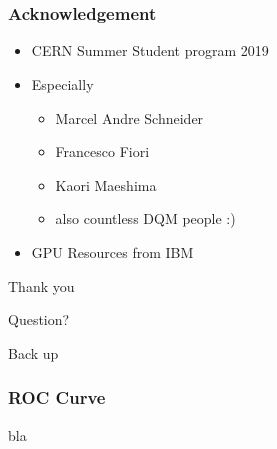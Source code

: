 \documentclass{beamer}
\begin{document}
\section{}
\begin{frame}
\frametitle{Acknowledgement}
\begin{itemize}
    \item CERN Summer Student program 2019
    \item Especially
    \begin{itemize}
        \item Marcel Andre Schneider
        \item Francesco Fiori
        \item Kaori Maeshima
        \item also countless DQM people :)
    \end{itemize}
    \item GPU Resources from IBM
\end{itemize}
\end{frame}

\begin{frame}
\Huge{\centerline{Thank you}}
\end{frame}
\begin{frame}
\Huge{\centerline{Question?}}
\end{frame}

\begin{frame}
\Huge{\centerline{Back up}}
\end{frame}

\begin{frame}
\frametitle{ROC Curve}
bla
\end{frame}

\end{document}
